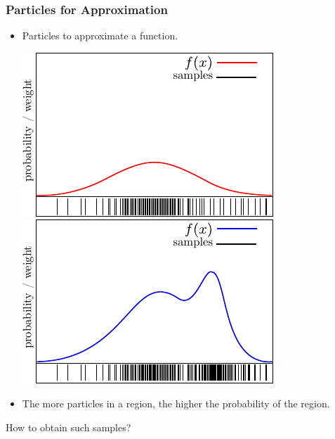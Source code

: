 \begin{frame}
    \frametitle{Particles for Approximation}
    \begin{itemize}
        \item Particles to approximate a function.
        \begin{center}
            \includegraphics[width=0.45\columnwidth]{./images/particle_filter/gaussian_approximation_by_sampling.pdf}
            \includegraphics[width=0.45\columnwidth]{./images/particle_filter/particles_for_approximation.pdf}
        \end{center}
        \item The more particles in a region, the higher the probability of the region.
    \end{itemize}
    \begin{center}
        \alert{How to obtain such samples?}
    \end{center}
\end{frame}

